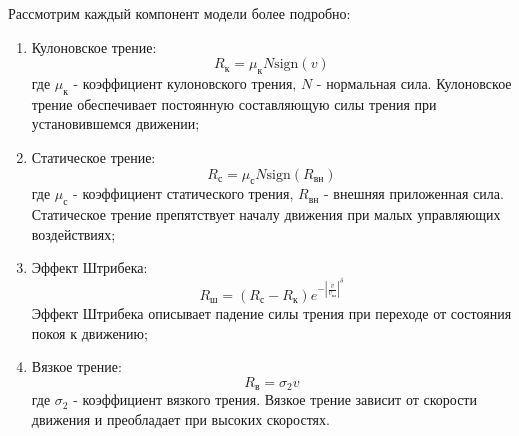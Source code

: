 Рассмотрим каждый компонент модели более подробно:
\begin{enumerate}
    \item Кулоновское трение:
          $$R_\text{к} = \mu_\text{к} N \text{sign}(v)$$
          где $\mu_\text{к}$ - коэффициент кулоновского трения, $N$ - нормальная сила. Кулоновское трение обеспечивает
          постоянную составляющую силы трения при установившемся движении;

    \item Статическое трение:
          $$R_\text{с} = \mu_\text{с} N \text{sign}(R_\text{вн})$$
          где $\mu_\text{с}$ - коэффициент статического трения, $R_\text{вн}$ - внешняя приложенная сила.
          Статическое трение препятствует началу движения при малых управляющих воздействиях;

    \item Эффект Штрибека:
          $$R_\text{ш} = (R_\text{с} - R_\text{к})e^{-\left|\frac{v}{v_\text{ш}}\right|^\delta}$$
          Эффект Штрибека описывает падение силы трения при переходе от состояния покоя к движению;

    \item Вязкое трение:
          $$R_\text{в} = \sigma_2 v$$
          где $\sigma_2$ - коэффициент вязкого трения. Вязкое трение зависит от скорости движения и преобладает при высоких скоростях.

\end{enumerate}





